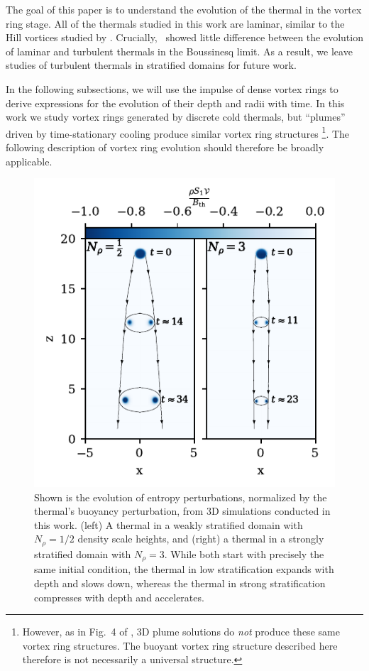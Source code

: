 The goal of this paper is to understand the evolution of the thermal in the vortex ring stage.
All of the thermals studied in this work are laminar, similar to the Hill vortices studied by \citet{brandenburg2016}.
Crucially, \LJ\, showed little difference between the evolution of laminar and turbulent thermals in the Boussinesq limit.
As a result, we leave studies of turbulent thermals in stratified domains for future work.

In the following subsections, we will use the impulse of dense vortex rings to derive expressions for the evolution of their depth and radii with time.
In this work we study vortex rings generated by discrete cold thermals, but ``plumes'' driven by time-stationary cooling produce similar vortex ring structures \cite[as in e.g.,][]{rast1998}\footnote{However, as in Fig.~4 of \citet{rast1999}, 3D plume solutions do \emph{not} produce these same vortex ring structures. The buoyant vortex ring structure described here therefore is not necessarily a universal structure.}.
The following description of vortex ring evolution should therefore be broadly applicable.

\begin{figure}[p!]
    \includegraphics[width=\columnwidth]{./figs/evolution_colormeshes.pdf}
    \caption[Pictoral description of the evolution of thermals as density stratification increases]
	{
	Shown is the evolution of entropy perturbations, normalized by the thermal's buoyancy perturbation, from 3D simulations conducted in this work.
	(left) A thermal in a weakly stratified domain with $N_\rho = 1/2$ density scale heights, and (right) a thermal in a strongly stratified domain with $N_\rho = 3$.
	While both start with precisely the same initial condition, the thermal in low stratification expands with depth and slows down, whereas the thermal in strong stratification compresses with depth and accelerates.
    \label{fig:evolution_colormeshes} }
\end{figure}



